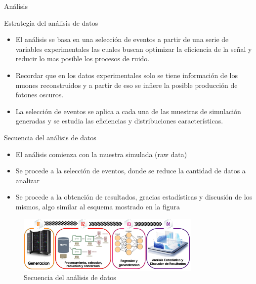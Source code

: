 \begin{frame}{}
    \begin{center}
        \LARGE An\'alisis
    \end{center}
\end{frame}


\begin{frame}{Estrategia del an\'alisis de datos}
\begin{itemize}
\item El an\'alisis se basa en una selecci\'on de eventos a partir de una serie de variables experimentales las cuales buscan optimizar la eficiencia de la se\~nal y reducir lo mas posible los procesos de ruido.
\item Recordar que en los datos experimentales solo se tiene informaci\'on de los muones reconstruidos y a partir de eso se infiere la posible producci\'on de fotones oscuros.
\item La selecci\'on de eventos se aplica a cada una de las muestras de simulaci\'on generadas y se estudia las eficiencias y distribuciones caracter\'isticas.
\end{itemize}    
\end{frame}


\begin{frame}{Secuencia del an\'alisis de datos}

\begin{itemize}
    \item El an\'alisis comienza con la muestra simulada (raw data) 
    \item Se procede a la selecci\'on de eventos, donde se reduce la cantidad de datos a analizar 
    \item Se procede a la obtenci\'on de resultados, gracias estad\'isticas y discusi\'on de los mismos, algo similar al esquema mostrado en la figura 
\end{itemize}


\begin{figure}[h]
\centering
\includegraphics[width=0.8\textwidth]{Imag/procesos_darksusy.png}
\caption{Secuencia del an\'alisis de datos}
\end{figure}

\end{frame}


